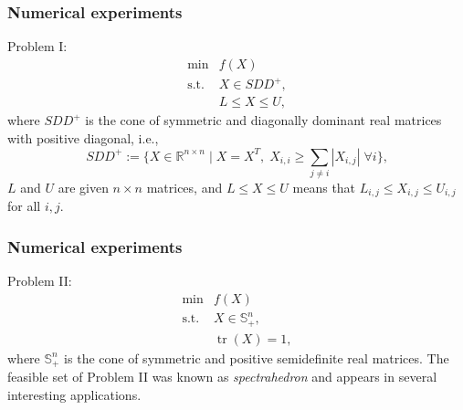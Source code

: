 \documentclass[xcolor=dvipsnames,aspectratio=169,13pt]{beamer} %
\DeclareMathOperator{\tr}{tr}
\begin{document}
\begin{frame}[t]\frametitle{Numerical experiments}
  \begin{block}{Problem I:}
    \begin{equation*} 
      \begin{array}{cl}
        \displaystyle\min     & f(X)           \\
        \mbox{s.t.} & X \in SDD^+,   \\
                    & L\leq X\leq U,
      \end{array}
    \end{equation*}
      where $SDD^+$ is the cone of symmetric and diagonally dominant real matrices with positive diagonal, i.e., 
      \[
        SDD^+ :=\{X\in\mathbb{R}^{n\times n}\mid X=X^T, \; X_{i,i}\geq \displaystyle\sum_{j\neq i}|X_{i,j}| \; \forall i\},
      \]
     $L$ and $U$ are given $n\times n$ matrices, and  $L\leq X\leq U$ means that $L_{i,j} \leq X_{i,j} \leq U_{i,j}$ for all $i,j$.
\end{block}

\end{frame}


\begin{frame}[t]\frametitle{Numerical experiments}
  \begin{block}{Problem II:}
    \begin{equation*}
      \begin{array}{cl}
        \displaystyle\min   & f(X)                  \\
        \mbox{s.t.}         & X \in \mathbb{S}^n_+, \\
                            & \tr(X)=1,
      \end{array}
    \end{equation*}
    where $\mathbb{S}^n_+$ is the cone of symmetric and positive semidefinite real matrices. The feasible set of Problem II was known as {\it spectrahedron} and appears in several interesting applications.
  \end{block}
\end{frame}
\end{document}
